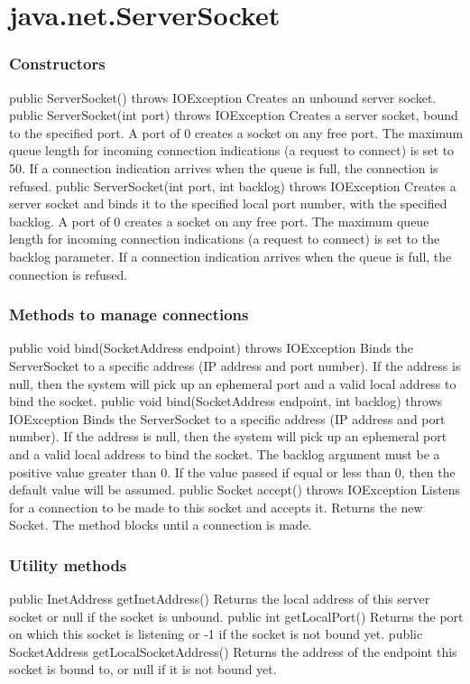 \section{java.net.ServerSocket}
\subsubsection{Constructors}
public ServerSocket() throws IOException
Creates an unbound server socket.
public ServerSocket(int port) throws IOException
Creates a server socket, bound to the specified port.
A port of 0 creates a socket on any free port.
The maximum queue length for incoming connection indications (a request to connect) is set to 50.
If a connection indication arrives when the queue is full, the connection is refused.
public ServerSocket(int port, int backlog) throws IOException
Creates a server socket and binds it to the specified local port number, with the specified backlog.
A port of 0 creates a socket on any free port.
The maximum queue length for incoming connection indications (a request to connect) is set to the backlog
parameter.
If a connection indication arrives when the queue is full, the connection is refused.
\subsubsection{Methods to manage connections}
public void bind(SocketAddress endpoint) throws IOException
Binds the ServerSocket to a specific address (IP address and port number).
If the address is null, then the system will pick up an ephemeral port and a valid local address to bind the socket.
public void bind(SocketAddress endpoint, int backlog) throws IOException
Binds the ServerSocket to a specific address (IP address and port number).
If the address is null, then the system will pick up an ephemeral port and a valid local address to bind the socket.
The backlog argument must be a positive value greater than 0. If the value passed if equal or less than 0, then the
default value will be assumed.
public Socket accept() throws IOException
Listens for a connection to be made to this socket and accepts it. Returns the new Socket.
The method blocks until a connection is made.
\subsubsection{Utility methods}
public InetAddress getInetAddress()
Returns the local address of this server socket or null if the socket is unbound.
public int getLocalPort()
Returns the port on which this socket is listening or -1 if the socket is not bound yet.
public SocketAddress getLocalSocketAddress()
Returns the address of the endpoint this socket is bound to, or null if it is not bound yet.

